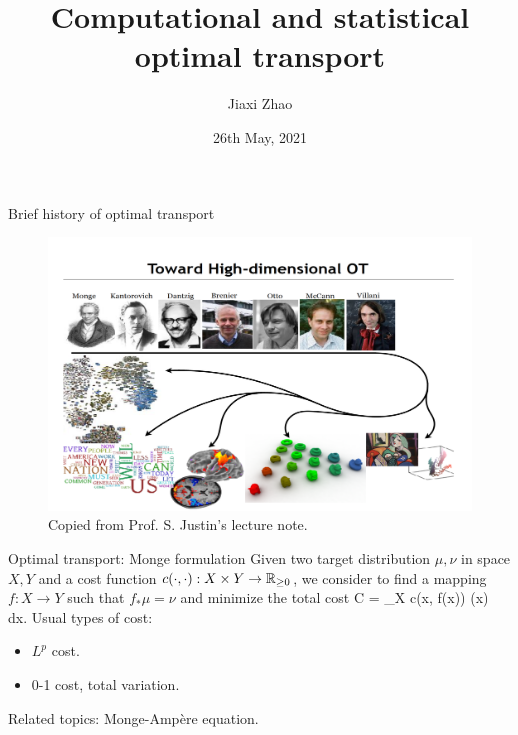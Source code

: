 \documentclass{beamer}
\title[Comp \& Stat OT]{Computational and statistical optimal transport}
\author[J. Zhao]{Jiaxi Zhao}
\date{26th May, 2021}
\begin{document}
\par \setlength{\parindent}{2em}

\begin{frame}
\titlepage

\end{frame}


\begin{frame}{Brief history of optimal transport}
    \begin{figure}[H]
          \centering
          \centerline{\includegraphics[width=\linewidth]{history.png}}
          \caption{Copied from Prof. S. Justin's lecture note.}
        \end{figure}
\end{frame}


\begin{frame}{Optimal transport: Monge formulation}
	Given two target distribution $\mu, \nu$ in space $X, Y$ and a cost function $c(\cdot, \cdot): X \times Y \rightarrow \mathbb{R}_{\geq 0}$, we consider to find a mapping $f: X \rightarrow Y$ such that $f_*\mu = \nu$ and minimize the total cost 
	\bequn
		C = \int_{X} c(x, f(x)) \mu(x) dx.
	\eequn
	Usual types of cost:
	\begin{itemize}
		\item $L^p$ cost.
		\item 0-1 cost, total variation.
	\end{itemize}
	Related topics: Monge-Amp\`ere equation.
\end{frame}
\end{document}
